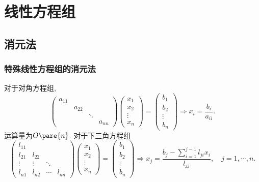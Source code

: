 \documentclass[hidelinks]{ctexart}
\begin{document}
\section{线性方程组} %
\label{sec:线性方程组}

\subsection{消元法} %
\label{sub:消元法}

\subsubsection{特殊线性方程组的消元法} %
\label{ssub:特殊线性方程组的消元法}

对于对角方程组,
\[ \begin{pmatrix}
    a_{11} & & & \\
    & a_{22} & & \\
    & & \ddots & \\
    & & & a_{nn}
\end{pmatrix} \begin{pmatrix}
    x_1 \\ x_2 \\ \vdots \\ x_n
\end{pmatrix} = \begin{pmatrix}
    b_1 \\ b_2 \\ \vdots \\ b_n
\end{pmatrix} \Rightarrow x_i = \frac{b_i}{a_{ii}}. \]
运算量为$O\pare{n}$. 对于下三角方程组
\[ \begin{pmatrix}
    l_{11} & & & \\
    l_{21} & l_{22} & & \\
    \vdots & \vdots & \ddots \\
    l_{n1} & l_{n2} & \cdots & l_{nn}
\end{pmatrix}\begin{pmatrix}
    x_1 \\ x_2 \\ \vdots \\ x_n
\end{pmatrix} = \begin{pmatrix}
    b_1 \\ b_2 \\ \vdots \\ b_n
\end{pmatrix} \Rightarrow x_j = \frac{b_j - \displaystyle \sum_{i=1}^{j-1} l_{ji}x_i}{l_{jj}},\quad j = 1,\cdots, n. \]
\end{document}
